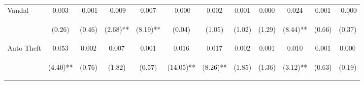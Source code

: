 \begin{tabular}{lccccccccccc}
\noalign{\smallskip}Vandal & 0.003 & -0.001 & -0.009 & 0.007 & -0.000 & 0.002 & 0.001 & 0.000 & 0.024 & 0.001 & -0.000\\
 & \begin{footnotesize}(0.26)\end{footnotesize} & \begin{footnotesize}(0.46)\end{footnotesize} & \begin{footnotesize}(2.68)**\end{footnotesize} & \begin{footnotesize}(8.19)**\end{footnotesize} & \begin{footnotesize}(0.04)\end{footnotesize} & \begin{footnotesize}(1.05)\end{footnotesize} & \begin{footnotesize}(1.02)\end{footnotesize} & \begin{footnotesize}(1.29)\end{footnotesize} & \begin{footnotesize}(8.44)**\end{footnotesize} & \begin{footnotesize}(0.66)\end{footnotesize} & \begin{footnotesize}(0.37)\end{footnotesize}\\
\noalign{\smallskip}Auto Theft & 0.053 & 0.002 & 0.007 & 0.001 & 0.016 & 0.017 & 0.002 & 0.001 & 0.010 & 0.001 & 0.000\\
 & \begin{footnotesize}(4.40)**\end{footnotesize} & \begin{footnotesize}(0.76)\end{footnotesize} & \begin{footnotesize}(1.82)\end{footnotesize} & \begin{footnotesize}(0.57)\end{footnotesize} & \begin{footnotesize}(14.05)**\end{footnotesize} & \begin{footnotesize}(8.26)**\end{footnotesize} & \begin{footnotesize}(1.85)\end{footnotesize} & \begin{footnotesize}(1.36)\end{footnotesize} & \begin{footnotesize}(3.12)**\end{footnotesize} & \begin{footnotesize}(0.63)\end{footnotesize} & \begin{footnotesize}(0.19)\end{footnotesize}\\

\end{tabular}

